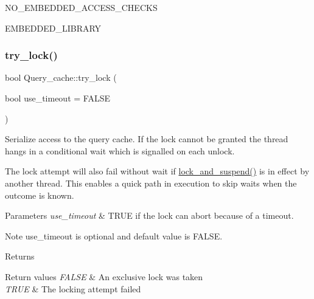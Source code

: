 N\+O\+\_\+\+E\+M\+B\+E\+D\+D\+E\+D\+\_\+\+A\+C\+C\+E\+S\+S\+\_\+\+C\+H\+E\+C\+KS

E\+M\+B\+E\+D\+D\+E\+D\+\_\+\+L\+I\+B\+R\+A\+RY \mbox{\label{classQuery__cache_af6f115d2cdd660b8a92dc7943926a1ee}} 
\subsubsection{\texorpdfstring{try\+\_\+lock()}{try\_lock()}}
{\footnotesize\ttfamily bool Query\+\_\+cache\+::try\+\_\+lock (\begin{DoxyParamCaption}\item[{bool}]{use\+\_\+timeout = {\ttfamily FALSE} }\end{DoxyParamCaption})}

Serialize access to the query cache. If the lock cannot be granted the thread hangs in a conditional wait which is signalled on each unlock.

The lock attempt will also fail without wait if \mbox{\hyperlink{classQuery__cache_ac89ccc6622e7b96b09a24ac6e43f4364}{lock\+\_\+and\+\_\+suspend()}} is in effect by another thread. This enables a quick path in execution to skip waits when the outcome is known.


\begin{DoxyParams}{Parameters}
{\em use\+\_\+timeout} & T\+R\+UE if the lock can abort because of a timeout.\\
\hline
\end{DoxyParams}
\begin{DoxyNote}{Note}
use\+\_\+timeout is optional and default value is F\+A\+L\+SE.
\end{DoxyNote}
\begin{DoxyReturn}{Returns}

\end{DoxyReturn}

\begin{DoxyRetVals}{Return values}
{\em F\+A\+L\+SE} & An exclusive lock was taken \\
\hline
{\em T\+R\+UE} & The locking attempt failed \\
\hline
\end{DoxyRetVals}
\mbox{\label{classQuery__cache_affb7d26533e0ed4ea0cbe1347c582bc7}} 

